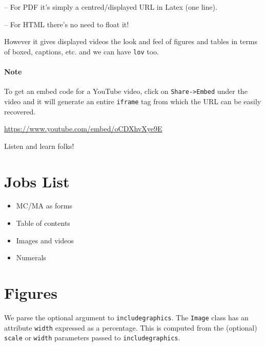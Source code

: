 \documentclass[12pt]{article}
\theoremstyle{plain}
\theoremstyle{definition}
\theoremstyle{remark}
\theoremstyle{mystyle}
\newcommand{\includevideo}[2][1]{\url{#2}}
\begin{document}
\par\qquad -- For PDF it's simply a centred/displayed URL in Latex (one line).
\par\qquad -- For HTML there's no need to float it!

However it gives displayed videos the look and feel of figures and tables in terms of boxed, captions, etc. and we can have {\tt lov} too.

\paragraph*{Note} To get an embed code for a YouTube video, click on {\tt Share->Embed} under the video and it will generate an entire {\tt iframe} tag from which the URL can be easily recovered.

\begin{video}
\centering
\includevideo[scale=0.5]{https://www.youtube.com/embed/oCDXhvXye9E}
\caption{Listen and learn folks!\label{vid:orange}}
\end{video}

\appendix
\section{Jobs List}
\begin{itemize}
\item MC/MA as forms
\item Table of contents
\item Images and videos
\item Numerals
\end{itemize}


\section{Figures}

We parse the optional argument to \texttt{includegraphics}. The \texttt{Image} class has an attribute \texttt{width} expressed as a percentage. This is computed from the (optional) \texttt{scale} or \texttt{width} parameters passed to \texttt{includegraphics}.
\end{document}
